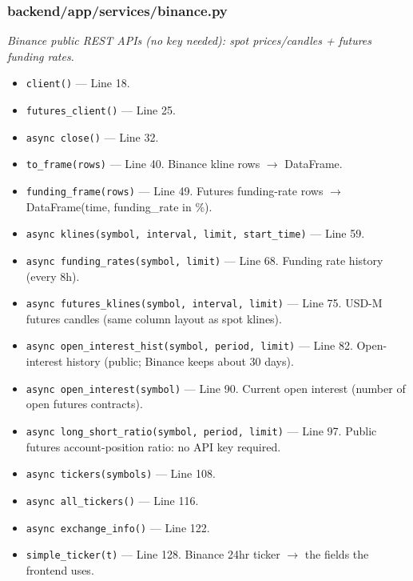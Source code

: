 \subsubsection*{backend/app/services/binance.py}
\textit{Binance public REST APIs (no key needed): spot prices/candles + futures funding rates.}
\begin{itemize}[nosep,leftmargin=1.5em]
\item \texttt{client(\allowbreak{})} --- Line 18.
\item \texttt{futures\_\allowbreak{}client(\allowbreak{})} --- Line 25.
\item \texttt{async close(\allowbreak{})} --- Line 32.
\item \texttt{to\_\allowbreak{}frame(\allowbreak{}rows)} --- Line 40. Binance kline rows $\rightarrow$ DataFrame.
\item \texttt{funding\_\allowbreak{}frame(\allowbreak{}rows)} --- Line 49. Futures funding-rate rows $\rightarrow$ DataFrame(time, funding\_rate in \%).
\item \texttt{async klines(\allowbreak{}symbol,\allowbreak{} interval,\allowbreak{} limit,\allowbreak{} start\_\allowbreak{}time)} --- Line 59.
\item \texttt{async funding\_\allowbreak{}rates(\allowbreak{}symbol,\allowbreak{} limit)} --- Line 68. Funding rate history (every 8h).
\item \texttt{async futures\_\allowbreak{}klines(\allowbreak{}symbol,\allowbreak{} interval,\allowbreak{} limit)} --- Line 75. USD-M futures candles (same column layout as spot klines).
\item \texttt{async open\_\allowbreak{}interest\_\allowbreak{}hist(\allowbreak{}symbol,\allowbreak{} period,\allowbreak{} limit)} --- Line 82. Open-interest history (public; Binance keeps about 30 days).
\item \texttt{async open\_\allowbreak{}interest(\allowbreak{}symbol)} --- Line 90. Current open interest (number of open futures contracts).
\item \texttt{async long\_\allowbreak{}short\_\allowbreak{}ratio(\allowbreak{}symbol,\allowbreak{} period,\allowbreak{} limit)} --- Line 97. Public futures account-position ratio: no API key required.
\item \texttt{async tickers(\allowbreak{}symbols)} --- Line 108.
\item \texttt{async all\_\allowbreak{}tickers(\allowbreak{})} --- Line 116.
\item \texttt{async exchange\_\allowbreak{}info(\allowbreak{})} --- Line 122.
\item \texttt{simple\_\allowbreak{}ticker(\allowbreak{}t)} --- Line 128. Binance 24hr ticker $\rightarrow$ the fields the frontend uses.
\end{itemize}
